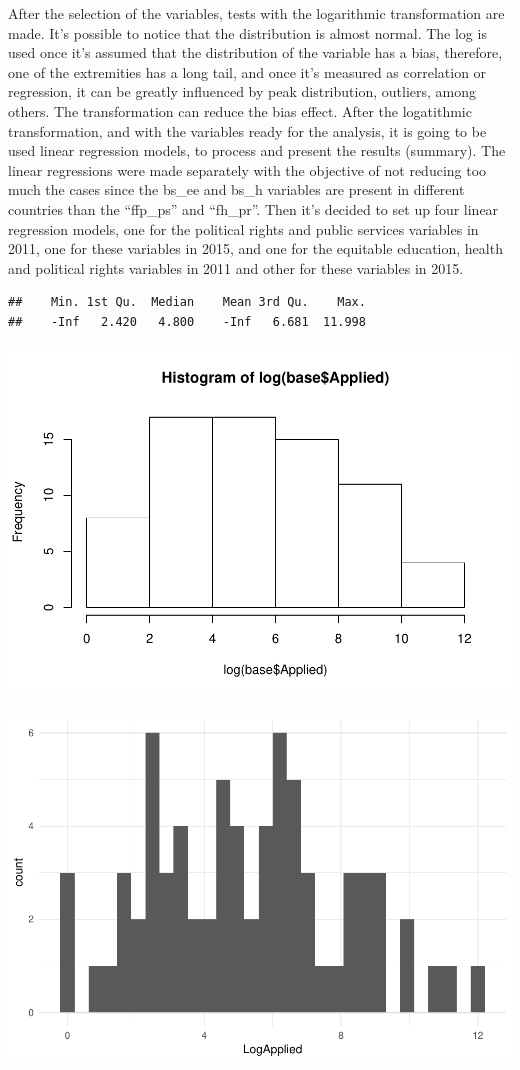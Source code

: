 \documentclass[]{elsarticle} %
\makeatletter
\def\maxwidth{\ifdim\Gin@nat@width>\linewidth\linewidth
\else\Gin@nat@width\fi}
\let\Oldincludegraphics\includegraphics
\renewcommand{\includegraphics}[1]{\Oldincludegraphics[width=\maxwidth]{#1}}
\makeatother
\begin{document}
After the selection of the variables, tests with the logarithmic
transformation are made. It's possible to notice that the distribution
is almost normal. The log is used once it's assumed that the
distribution of the variable has a bias, therefore, one of the
extremities has a long tail, and once it's measured as correlation or
regression, it can be greatly influenced by peak distribution, outliers,
among others. The transformation can reduce the bias effect. After the
logatithmic transformation, and with the variables ready for the
analysis, it is going to be used linear regression models, to process
and present the results (summary). The linear regressions were made
separately with the objective of not reducing too much the cases since
the bs\_ee and bs\_h variables are present in different countries than
the ``ffp\_ps'' and ``fh\_pr''. Then it's decided to set up four linear
regression models, one for the political rights and public services
variables in 2011, one for these variables in 2015, and one for the
equitable education, health and political rights variables in 2011 and
other for these variables in 2015.

\begin{verbatim}
##    Min. 1st Qu.  Median    Mean 3rd Qu.    Max. 
##    -Inf   2.420   4.800    -Inf   6.681  11.998
\end{verbatim}

\includegraphics{refugees-stephanie_files/figure-latex/histo_2-1.pdf}

\includegraphics{refugees-stephanie_files/figure-latex/base_log-1.pdf}
\end{document}
